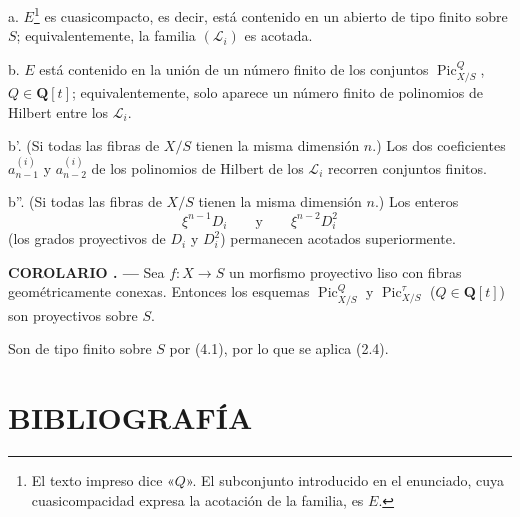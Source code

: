 \documentclass[11pt,twoside,openany]{book}
\numberwithin{equation}{section}
\newcommand{\src}[1]{%
  \phantomsection\hypertarget{src:#1}{}%
  \marginpar{\raggedleft\footnotesize\sffamily #1}%
}
\theoremstyle{plain}
\theoremstyle{definition}
\theoremstyle{remark}
\newcommand{\result}[2]{%
  \par\medskip\noindent\textbf{#1%
  \if\relax\detokenize{#2}\relax\else\space#2\fi. ---}\enspace
}
\newcommand{\FgaUnitKey}{frontmatter}
\renewcommand{\src}[1]{%
  \phantomsection\hypertarget{src:\FgaUnitKey:#1}{}%
  \marginpar{\raggedleft\footnotesize\sffamily #1}%
}
\theoremstyle{plain}
\theoremstyle{definition}
\theoremstyle{remark}
\begin{document}
\noindent a. $E$\footnote{El texto impreso dice «$Q$». El subconjunto
introducido en el enunciado, cuya cuasicompacidad expresa la acotación de la
familia, es $E$.} es cuasicompacto, es decir, está contenido en un abierto de
tipo finito sobre $S$; equivalentemente, la familia $(\mathcal L_i)$ es
acotada.

\noindent b. $E$ está contenido en la unión de un número finito de los
conjuntos $\operatorname{Pic}_{X/S}^Q$, $Q\in\mathbf Q[t]$; equivalentemente,
solo aparece un número finito de polinomios de Hilbert entre los
$\mathcal L_i$.

\noindent b'. (Si todas las fibras de $X/S$ tienen la misma dimensión $n$.)
Los dos coeficientes $a_{n-1}^{(i)}$ y $a_{n-2}^{(i)}$ de los polinomios de
Hilbert de los $\mathcal L_i$ recorren conjuntos finitos.

\src{243}
\noindent b''. (Si todas las fibras de $X/S$ tienen la misma dimensión $n$.)
Los enteros
\[
\xi^{n-1}D_i\qquad\text{y}\qquad\xi^{n-2}D_i^2
\]
(los grados proyectivos de $D_i$ y $D_i^2$) permanecen acotados superiormente.

\result{COROLARIO}{4.2} Sea $f:X\longrightarrow S$ un morfismo proyectivo liso
con fibras geométricamente conexas. Entonces los esquemas
$\operatorname{Pic}_{X/S}^Q$ y $\operatorname{Pic}_{X/S}^\tau$
($Q\in\mathbf Q[t]$) son proyectivos sobre $S$.

Son de tipo finito sobre $S$ por (4.1), por lo que se aplica (2.4).

\section*{BIBLIOGRAFÍA}
\end{document}

